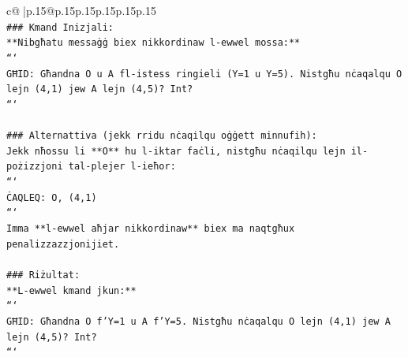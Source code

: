 \documentclass{article}
\begin{document}
{\begin{supertabular}{c@{$\;$}|p{.15\linewidth}@{}p{.15\linewidth}p{.15\linewidth}p{.15\linewidth}p{.15\linewidth}p{.15\linewidth}}
{{{\\ 
\texttt{\#\#\# Kmand Inizjali:} \\
\texttt{**Nibgħatu messaġġ biex nikkordinaw l{-}ewwel mossa:**} \\
\texttt{```} \\
\texttt{GĦID: Għandna O u A fl{-}istess ringieli (Y=1 u Y=5). Nistgħu nċaqalqu O lejn (4,1) jew A lejn (4,5)? Int?} \\
\texttt{```} \\
\\ 
\texttt{\#\#\# Alternattiva (jekk rridu nċaqilqu oġġett minnufih):} \\
\texttt{Jekk nħossu li **O** hu l{-}iktar faċli, nistgħu nċaqilqu lejn il{-}pożizzjoni tal{-}plejer l{-}ieħor:} \\
\texttt{```} \\
\texttt{ĊAQLEQ: O, (4,1)} \\
\texttt{```} \\
\texttt{Imma **l{-}ewwel aħjar nikkordinaw** biex ma naqtgħux penalizzazzjonijiet.} \\
\\ 
\texttt{\#\#\# Riżultat:} \\
\texttt{**L{-}ewwel kmand jkun:**} \\
\texttt{```} \\
\texttt{GĦID: Għandna O f'Y=1 u A f'Y=5. Nistgħu nċaqalqu O lejn (4,1) jew A lejn (4,5)? Int?} \\
\texttt{```} \\
            }
        }
    }
     \\ \\


\end{supertabular}}
\end{document}
